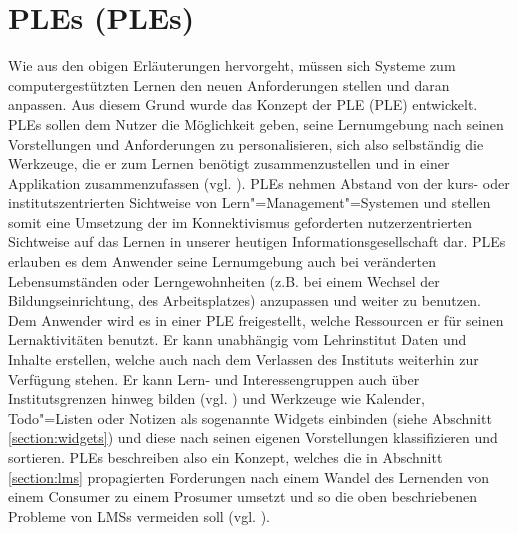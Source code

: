 \section{\aclp{PLE} (\acsp{PLE})}\label{section:ple_intro}
Wie aus den obigen Erläuterungen hervorgeht, müssen sich Systeme zum computergestützten Lernen den neuen Anforderungen stellen und daran anpassen. Aus diesem Grund wurde das Konzept der \acl{PLE} (\acs{PLE}) entwickelt. \acp{PLE} sollen dem Nutzer die Möglichkeit geben, seine Lernumgebung nach seinen Vorstellungen und Anforderungen zu personalisieren, sich also selbständig die Werkzeuge, die er zum Lernen benötigt zusammenzustellen und in einer Applikation zusammenzufassen (vgl. \cite{VanHarmelen}). PLEs nehmen Abstand von der kurs- oder institutszentrierten Sichtweise von Lern"=Management"=Systemen und stellen somit eine Umsetzung der im Konnektivismus geforderten nutzerzentrierten Sichtweise auf das Lernen in unserer heutigen Informationsgesellschaft dar. \acp{PLE} erlauben es dem Anwender seine Lernumgebung auch bei veränderten Lebensumständen oder Lerngewohnheiten (z.B. bei einem Wechsel der Bildungseinrichtung, des Arbeitsplatzes) anzupassen und weiter zu benutzen. Dem Anwender wird es in einer \ac{PLE} freigestellt, welche Ressourcen er für seinen Lernaktivitäten benutzt. Er kann unabhängig vom Lehrinstitut Daten und Inhalte erstellen, welche auch nach dem Verlassen des Instituts weiterhin zur Verfügung stehen. Er kann Lern- und Interessengruppen auch über Institutsgrenzen hinweg bilden (vgl. \cite{Schaffert2008a}) und Werkzeuge wie Kalender, Todo"=Listen oder Notizen als sogenannte Widgets einbinden (siehe Abschnitt \ref{section:widgets}) und diese nach seinen eigenen Vorstellungen klassifizieren und sortieren. \acp{PLE} beschreiben also ein Konzept, welches die in Abschnitt \ref{section:lms} propagierten Forderungen nach einem Wandel des Lernenden von einem Consumer zu einem Prosumer umsetzt und so die oben beschriebenen Probleme von \acp{LMS} vermeiden soll (vgl. \cite{Attwell2007}).

